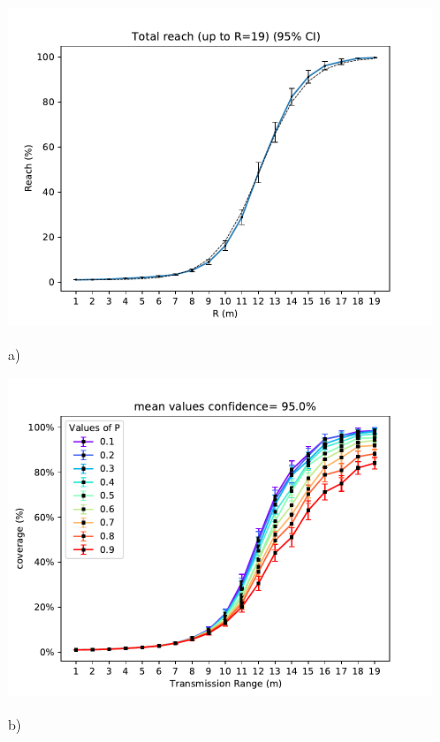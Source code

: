 \begin{figure}[H]
	\begin{minipage}{.5\textwidth}
        \includegraphics[scale=.5]{img/graphAnalysisTotal_reachR19.pdf}
        \begin{center}
            a)
        \end{center}
	\end{minipage}
	\begin{minipage}{.5\textwidth} 
		\includegraphics[scale=.5]{img/big_coverage_r_mean_95.0.pdf}
		\begin{center}
            b)
        \end{center}
	\end{minipage}
	\caption{}
    \label{fig:reachR30}
\end{figure}
